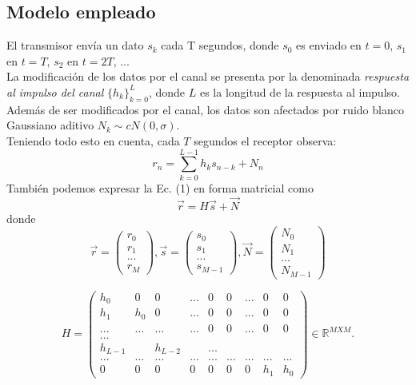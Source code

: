 \documentclass[10pt,journal,compsoc]{IEEEtran}
\begin{document}
\subsection{Modelo empleado}
El transmisor env\'ia un dato ${s_{k}}$ cada T segundos, donde ${s_0}$ es enviado en $t = 0$, ${s_1}$ en $t = T$, ${s_2}$ en $t = 2T$, ...\\
La modificaci\'on de los datos por el canal se presenta por la denominada \textit{respuesta al impulso del canal} $\{{h_{k}\}}_{k=0}^{L}$, donde $L$ es la longitud de la respuesta al impulso. \\
Adem\'as de ser modificados por el canal, los datos son afectados por ruido blanco Gaussiano aditivo ${N_k}\sim cN(0, \sigma)$.\\
Teniendo todo esto en cuenta, cada $T$ segundos el receptor observa: \\
\begin{equation}
r_n = \sum_{k=0}^{L-1} {h_{k}s_{n-k}}+N_n
\end{equation}
Tambi\'en podemos expresar la Ec. (1) en forma matricial como
\begin{equation}
\vec{r} = H\vec{s}+\vec{N}
\end{equation}
donde
\begin{equation}
\vec{r} = \left(
\begin{array}{c}
r_0\\ r_1\\ ...\\r_M
\end{array}
\right)
 , \vec{s}= \left(
\begin{array}{c}
s_0\\ s_1\\ ...\\s_{M-1}
\end{array}
\right)  ,
\vec{N}=\left(
\begin{array}{c}
N_0\\ N_1\\ ...\\N_{M-1}
\end{array}
\right)
\end{equation}

\begin{equation}
H = \left(
\begin{array}{ccccccccc}
h_0 & 0 & 0 & ... & 0 & 0 & ... & 0 & 0\\ h_1 & h_0 &0&...&0&0&...&0&0\\ ...& ...&...&...&0&0&...&0&0   \\ ...\\h_{L-1}&& h_{L-2}&&... \\ ...&...&...&...&...&...&...&... &... \\ 0&0&0&0&0&0&0&h_1 & h_0
\end{array}
\right) \in \mathbb{R}^{M X M}.
\end{equation}
\end{document}
